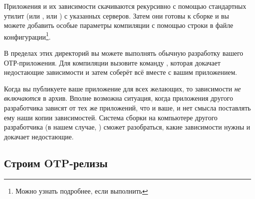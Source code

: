 Приложения и их зависимости скачиваются рекурсивно с помощью стандартных утилит  (или , или ) с указанных серверов. Затем они готовы к сборке и вы можете добавить особые параметры компиляции с помощью строки  в файле конфигурации\footnote{Можно узнать подробнее, если выполнить }.

В пределах этих директорий вы можете выполнять обычную разработку вашего ОТР-приложения. Для компиляции вызовите команду , которая докачает недостающие зависимости и затем соберёт всё вместе с вашим приложением.

Когда вы публикуете ваше приложение для всех желающих, то зависимости \emph{не включаются} в архив. Вполне возможна ситуация, когда приложения другого разработчика зависят от тех же приложений, что и ваше, и нет смысла поставлять ему наши копии зависимостей. Система сборки на компьютере другого разработчика (в нашем случае, ) сможет разобраться, какие зависимости нужны и докачает недостающие.


\subsection{Строим OTP-релизы}
\label{subsec:building-otp-releases}


